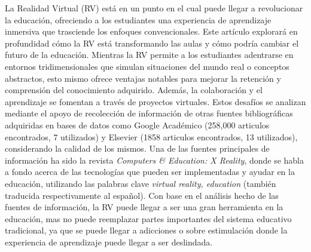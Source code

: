 La Realidad Virtual (RV) está en un punto en el cual puede llegar a revolucionar la educación, ofreciendo a los estudiantes una experiencia de aprendizaje inmersiva que trasciende los enfoques convencionales. Este artículo explorará en profundidad cómo la RV está transformando las aulas y cómo podría cambiar el futuro de la educación. Mientras la RV permite a los estudiantes adentrarse en entornos tridimensionales que simulan situaciones del mundo real o conceptos abstractos, esto mismo ofrece ventajas notables para mejorar la retención y comprensión del conocimiento adquirido. Además, la colaboración y el aprendizaje se fomentan a través de proyectos virtuales. Estos desafíos se analizan mediante el apoyo de recolección de información de otras fuentes bibliográficas adquiridas en bases de datos como Google Académico (258,000 articulos encontrados, 7 utilizados) y Elsevier (1858 articulos encontrados, 13 utilizados), considerando la calidad de los mismos. Una de las fuentes principales de información ha sido la revista \textit{Computers \& Education: X Reality}, donde se habla a fondo acerca de las tecnologías que pueden ser implementadas y ayudar en la educación, utilizando las palabras clave \textit{virtual reality, education} (también traducida respectivamente al español). Con base en el análisis hecho de las fuentes de información, la RV puede llegar a ser una gran herramienta en la educación, mas no puede reemplazar partes importantes del sistema educativo tradicional, ya que se puede llegar a adicciones o sobre estimulación donde la experiencia de aprendizaje puede llegar a ser deslindada.

